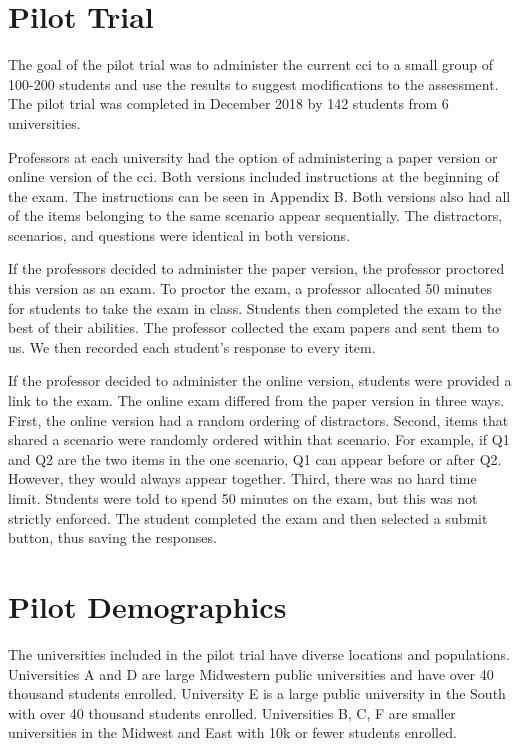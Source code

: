 \FloatBarrier






\section{Pilot Trial}

The goal of the pilot trial was to administer the current \gls{cci} to a small group of 100-200 students and use the results to suggest modifications to the assessment. The pilot trial was completed in December 2018 by 142 students from 6 universities.

Professors at each university had the option of administering a paper version or online version of the \gls{cci}. Both versions included instructions at the beginning of the exam. \iflong The instructions can be seen in Appendix B. \fi Both versions also had all of the items belonging to the same scenario appear sequentially. The distractors, scenarios, and questions were identical in both versions. 

If the professors decided to administer the paper version, the professor proctored this version as an exam. To proctor the exam, a professor allocated 50 minutes for students to take the exam in class. Students then completed the exam to the best of their abilities. The professor collected the exam papers and sent them to us. We then recorded each student's response to every item. 

If the professor decided to administer the online version, students were provided a link to the exam. The online exam differed from the paper version in three ways. First, the online version had a random ordering of distractors. Second, items that shared a scenario were randomly ordered within that scenario. For example, if Q1 and Q2 are the two items in the one scenario, Q1 can appear before or after Q2. However, they would always appear together. Third, there was no hard time limit. Students were told to spend 50 minutes on the exam, but this was not strictly enforced. The student completed the exam and then selected a submit button, thus saving the responses.


\FloatBarrier
\section{Pilot Demographics}

The universities included in the pilot trial have diverse locations and populations. Universities A and D are large Midwestern public universities and have over 40 thousand students enrolled. University E is a large public university in the South with over 40 thousand students enrolled. Universities B, C, F are smaller universities in the Midwest and East with 10k or fewer students enrolled.

